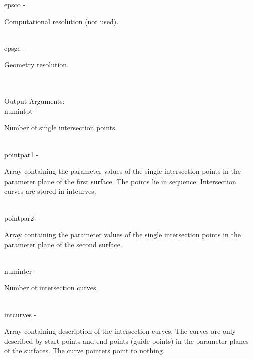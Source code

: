         \>\>    {\fov epsco}\> - \>     \begin{minipg2}
                                Computational resolution (not used).
                                \end{minipg2}\\
        \>\>    {\fov epsge}\> - \>     \begin{minipg2}
                                Geometry resolution.
                                \end{minipg2} \\
\\
        \>Output Arguments:\\
        \>\>    {\fov numintpt}\> - \>  \begin{minipg2}
                                Number of single intersection points.
                                \end{minipg2}\\
        \>\>    {\fov pointpar1}\> - \>\begin{minipg2}
                                Array containing the parameter values of the single
                                intersection points in the parameter plane of the
                                first surface. The points lie in sequence. Intersection
                                curves are stored in intcurves.
                                \end{minipg2}\\[0.8ex]
        \>\>    {\fov pointpar2}\> - \>\begin{minipg2}
                                Array containing the parameter values of the single
                                intersection points in the parameter plane of the
                                second surface.
                                \end{minipg2}\\[0.8ex]
        \>\>    {\fov numintcr}\> - \>  \begin{minipg2}
                                Number of intersection curves.
                                \end{minipg2}\\
        \>\>    {\fov intcurves}\> - \>\begin{minipg2}
                                Array containing description of the intersection
                                curves. The curves are only described
                                by start points and end points (guide
                                points) in
                                the parameter planes of the surfaces.
                                The curve pointers point to
                                nothing.
                                \end{minipg2}\\[0.3ex]
